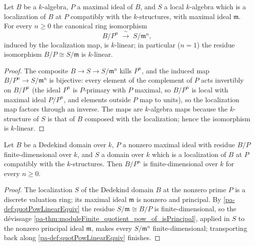 \begin{definition}
  \label{pa-def:quotPowLinearEquiv}
  \leanok

  Let \(B\) be a \(k\)-algebra, \(P\) a maximal ideal of \(B\), and \(S\) a local
  \(k\)-algebra which is a localization of \(B\) at \(P\) compatibly with the
  \(k\)-structures, with maximal ideal \(\mathfrak m\). For every \(n \ge 0\) the
  canonical ring isomorphism
  \[
    B/P^n \;\xrightarrow{\ \sim\ }\; S/\mathfrak m^n ,
  \]
  induced by the localization map, is \(k\)-linear; in particular (\(n = 1\)) the
  residue isomorphism \(B/P \cong S/\mathfrak m\) is \(k\)-linear.
\end{definition}
\begin{proof}
  \leanok
  The composite \(B \to S \to S/\mathfrak m^n\) kills \(P^n\), and the induced map
  \(B/P^n \to S/\mathfrak m^n\) is bijective: every element of the complement of \(P\)
  acts invertibly on \(B/P^n\) (the ideal \(P^n\) is \(P\)-primary with \(P\) maximal,
  so \(B/P^n\) is local with maximal ideal \(P/P^n\), and elements outside \(P\) map to
  units), so the localization map factors through an inverse. The maps are
  \(k\)-algebra maps because the \(k\)-structure of \(S\) is that of \(B\) composed
  with the localization; hence the isomorphism is \(k\)-linear.
\end{proof}

\begin{theorem}
  \label{pa-thm:moduleFinite_quotient_pow_atPrime}
  \leanok

  Let \(B\) be a Dedekind domain over \(k\), \(P\) a nonzero maximal ideal with
  residue \(B/P\) finite-dimensional over \(k\), and \(S\) a domain over \(k\) which
  is a localization of \(B\) at \(P\) compatibly with the \(k\)-structures. Then
  \(B/P^n\) is finite-dimensional over \(k\) for every \(n \ge 0\).
\end{theorem}
\begin{proof}
  \leanok
  The localization \(S\) of the Dedekind domain \(B\) at the nonzero prime \(P\) is a
  discrete valuation ring; its maximal ideal \(\mathfrak m\) is nonzero and principal.
  By \ref{pa-def:quotPowLinearEquiv} the residue \(S/\mathfrak m \cong B/P\) is
  finite-dimensional, so the d\'evissage
  \ref{pa-thm:moduleFinite_quotient_pow_of_isPrincipal}, applied in \(S\) to the nonzero
  principal ideal \(\mathfrak m\), makes every \(S/\mathfrak m^n\) finite-dimensional;
  transporting back along \ref{pa-def:quotPowLinearEquiv} finishes.
\end{proof}

